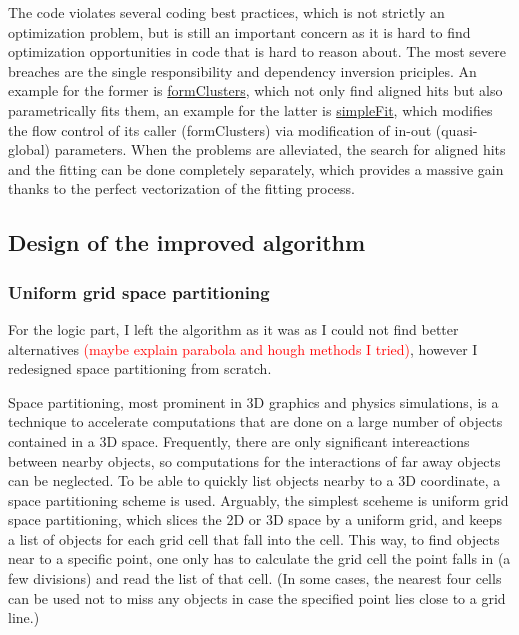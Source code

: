 \documentclass[12pt]{article}
\begin{document}
The code violates several coding best practices, which is not strictly an optimization problem, but is still an important concern as it is hard to find optimization opportunities in code that is hard to reason about. The most severe breaches are the single responsibility and dependency inversion priciples. An example for the former is \href{https://gitlab.cern.ch/lhcb/Rec/blob/1b7edc5aea96f2225601238b3f64e478e41b6c70/Pr/PrVeloUT/src/PrVeloUT.cpp#L337}{formClusters}, which not only find aligned hits but also parametrically fits them, an example for the latter is \href{https://gitlab.cern.ch/lhcb/Rec/blob/1b7edc5aea96f2225601238b3f64e478e41b6c70/Pr/PrVeloUT/src/PrVeloUT.h#L191}{simpleFit}, which modifies the flow control of its caller (formClusters) via modification of in-out (quasi-global) parameters. When the problems are alleviated, the search for aligned hits and the fitting can be done completely separately, which provides a massive gain thanks to the perfect vectorization of the fitting process.


\subsection{Design of the improved algorithm}

\subsubsection{Uniform grid space partitioning}\label{sec_velout_space_partitioning}

For the logic part, I left the algorithm as it was as I could not find better alternatives \textcolor{red}{(maybe explain parabola and hough methods I tried)}, however I redesigned space partitioning from scratch.

Space partitioning, most prominent in 3D graphics and physics simulations, is a technique to accelerate computations that are done on a large number of objects contained in a 3D space. Frequently, there are only significant intereactions between nearby objects, so computations for the interactions of far away objects can be neglected. To be able to quickly list objects nearby to a 3D coordinate, a space partitioning scheme is used. Arguably, the simplest sceheme is uniform grid space partitioning, which slices the 2D or 3D space by a uniform grid, and keeps a list of objects for each grid cell that fall into the cell. This way, to find objects near to a specific point, one only has to calculate the grid cell the point falls in (a few divisions) and read the list of that cell. (In some cases, the nearest four cells can be used not to miss any objects in case the specified point lies close to a grid line.)
\end{document}
